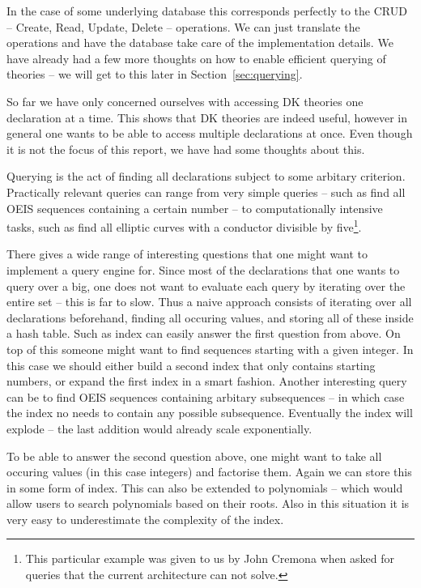 In the case of some underlying database
this corresponds perfectly to the CRUD -- Create, Read, Update, Delete -- operations.
We can
just translate the operations and have the database take care of the implementation details. We
have already had a few more thoughts on how to enable efficient querying of theories -- we will
get to this later in Section~\ref{sec:querying}.

So far we have only concerned ourselves with accessing DK theories one declaration at a
time. This shows that DK theories are indeed useful, however in general one wants to be
able to access multiple declarations at once. Even though it is not the focus of this
report, we have had some thoughts about this.

Querying is the act of finding all declarations subject to some arbitary
criterion. Practically relevant queries can range from very simple queries -- such as find
all OEIS sequences containing a certain number -- to computationally intensive tasks, such
as find all elliptic curves with a conductor divisible by five\footnote{This particular
  example was given to us by John Cremona when asked for queries that the current
  architecture can not solve. }.

There gives a wide range of interesting questions that one might want to implement a query
engine for. Since most of the declarations that one wants to query over a big, one does
not want to evaluate each query by iterating over the entire set -- this is far to
slow. Thus a naive approach consists of iterating over all declarations beforehand,
finding all occuring values, and storing all of these inside a hash table. Such as index
can easily answer the first question from above. On top of this someone might want to find
sequences starting with a given integer. In this case we should either build a second
index that only contains starting numbers, or expand the first index in a smart
fashion. Another interesting query can be to find OEIS sequences containing arbitary
subsequences -- in which case the index no needs to contain any possible
subsequence. Eventually the index will explode -- the last addition would already scale
exponentially.

To be able to answer the second question above, one might want to take all occuring values
(in this case integers) and factorise them. Again we can store this in some form of
index. This can also be extended to polynomials -- which would allow users to search
polynomials based on their roots. Also in this situation it is very easy to underestimate
the complexity of the index.


